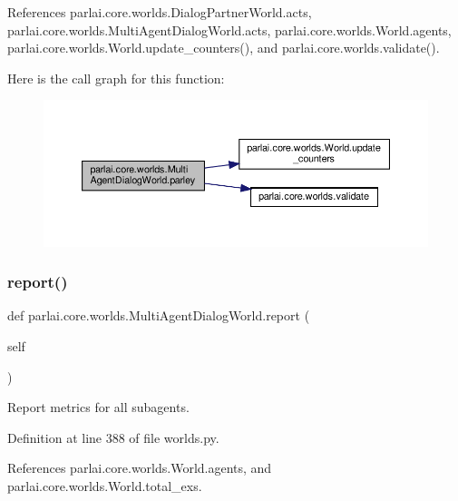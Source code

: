 References parlai.\+core.\+worlds.\+Dialog\+Partner\+World.\+acts, parlai.\+core.\+worlds.\+Multi\+Agent\+Dialog\+World.\+acts, parlai.\+core.\+worlds.\+World.\+agents, parlai.\+core.\+worlds.\+World.\+update\+\_\+counters(), and parlai.\+core.\+worlds.\+validate().

Here is the call graph for this function\+:
\nopagebreak
\begin{figure}[H]
\begin{center}
\leavevmode
\includegraphics[width=350pt]{classparlai_1_1core_1_1worlds_1_1MultiAgentDialogWorld_a2b41d3026bc5afa04e7f874ba097b721_cgraph}
\end{center}
\end{figure}
\mbox{\label{classparlai_1_1core_1_1worlds_1_1MultiAgentDialogWorld_a686b237998ede0e9431dd58bca2b34c1}} 
\subsubsection{\texorpdfstring{report()}{report()}}
{\footnotesize\ttfamily def parlai.\+core.\+worlds.\+Multi\+Agent\+Dialog\+World.\+report (\begin{DoxyParamCaption}\item[{}]{self }\end{DoxyParamCaption})}

\begin{DoxyVerb}Report metrics for all subagents.\end{DoxyVerb}
 

Definition at line 388 of file worlds.\+py.



References parlai.\+core.\+worlds.\+World.\+agents, and parlai.\+core.\+worlds.\+World.\+total\+\_\+exs.

